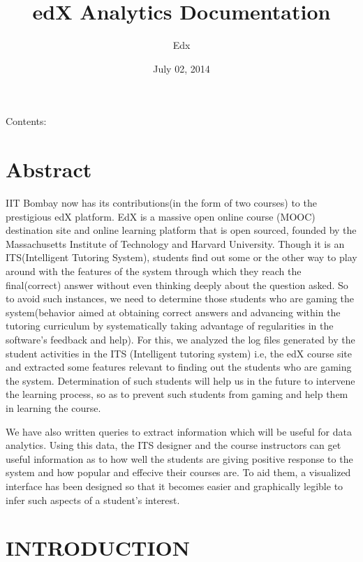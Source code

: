 \documentclass[a4paper,12pt,oneside]{sphinxmanual}
\title{edX Analytics Documentation}
\date{July 02, 2014}
\author{Edx}
\begin{document}
\maketitle
\tableofcontents
{}\label{index::doc}


Contents:


\chapter{\textbf{Abstract}}
\label{document:welcome-to-edx-analytics-documentation}\label{document:abstract}\label{document::doc}
IIT Bombay now has its contributions(in the form of two courses) to the prestigious edX platform. EdX is a massive open online course (MOOC) destination site and online learning platform that is open sourced, founded by the Massachusetts Institute of Technology and Harvard University. Though it is an ITS(Intelligent Tutoring System), students find out some or the other way to play around with the features of the system through which they reach the final(correct) answer without even thinking deeply about the question asked. So to avoid such instances, we need to determine those students who are gaming the system(behavior aimed at obtaining correct answers and advancing within the tutoring curriculum by systematically taking advantage of regularities in the software’s feedback and help). For this, we analyzed the log files generated by the student activities in the ITS (Intelligent tutoring system) i.e, the edX course site and extracted some features relevant to finding out the students who are gaming the system. Determination of such students will help us in the future to intervene the learning process, so as to prevent such students from  gaming and help them in learning the course.

We have also written queries to extract information which will be useful for data analytics. Using this data, the ITS designer and the course instructors can get useful information as to how well the students are giving positive response to the system and how popular and effecive their courses are. To aid them, a visualized interface has been designed so that it becomes easier and graphically legible to infer such aspects of a student's interest.


\chapter{\textbf{INTRODUCTION}}
\label{document:introduction}
\end{document}
